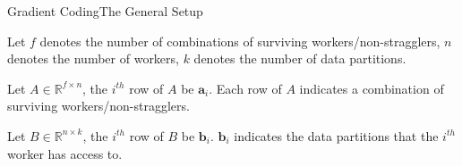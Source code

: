 \documentclass{beamer}
\begin{document}
\begin{frame}{Gradient Coding}{The General Setup}

\begin{definition}
    Let $f$ denotes the number of combinations of surviving workers/non-stragglers, $n$ denotes the number of workers, $k$ denotes the number of data partitions.
\end{definition}

\begin{definition}
    Let $A \in \mathbb{R}^{f \times n}$, the $i^{th}$ row of $A$ be $\boldsymbol{a}_i$. Each row of $A$ indicates a combination of surviving workers/non-stragglers.
\end{definition}

\begin{definition}
    Let $B \in \mathbb{R}^{n \times k}$, the $i^{th}$ row of $B$ be $\boldsymbol{b}_i$. $\boldsymbol{b}_i$ indicates the data partitions that the $i^{th}$ worker has access to.
\end{definition}

\end{frame}
\end{document}
